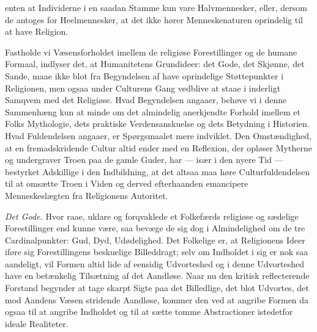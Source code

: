 \documentclass[12pt,a4paper]{book}
\begin{document}

enten at Individerne i en saadan Stamme kun vare Halvmennesker, eller, dersom de
antoges for Heelmennesker, at det ikke hører Menneskenaturen oprindelig til at
have Religion.

Fastholde vi Væsensforholdet imellem de religiøse Forestillinger og de humane
Formaal, indlyser det, at Humanitetens Grundideer: det Gode, det Skjønne, det
Sande, maae ikke blot fra Begyndelsen af have oprindelige Støttepunkter i
Religionen, men ogsaa under Culturens Gang vedblive at staae i inderligt Samqvem
med det Religiøse. Hvad Begyndelsen angaaer, behøve vi i denne Sammenhæng kun at
minde om det almindelig anerkjendte Forhold imellem et Folks Mythologie, dets
praktiske Verdensanskuelse og dets Betydning i Historien. Hvad Fuldendelsen
angaaer, er Spørgsmaalet mere indviklet. Den Omstændighed, at en fremadskridende
Cultur altid ender med en Reflexion, der opløser Mytherne og undergraver Troen
paa de gamle Guder, har --- især i den nyere Tid --- bestyrket Adskillige i den
Indbildning, at det altsaa maa høre Culturfuldendelsen til at omsætte Troen i
Viden og derved efterhaanden emancipere Menneskeslægten fra Religionens
Autoritet.

\emph{Det Gode.} Hvor raae, uklare og forqvaklede et Folkefærds religiøse og
sædelige Forestillinger end kunne være, saa bevæge de sig dog i Almindelighed om
de tre Cardinalpunkter: Gud, Dyd, Udødelighed. Det Folkelige er, at Religionens
Ideer iføre sig Forestillingens beskuelige Billeddragt; selv om Indholdet i sig
er nok saa aandeligt, vil Formen altid lide af eensidig Udvorteshed og i denne
Udvorteshed have en betænkelig Tilsætning af det Aandløse. Naar nu den kritisk
reflecterende Forstand begynder at tage skarpt Sigte paa det Billedlige, det blot
Udvortes, det mod Aandens Væsen stridende Aandløse, kommer den ved at angribe
Formen da ogsaa til at angribe Indholdet og til at sætte tomme Abstractioner
istedetfor ideale Realiteter.
\end{document}
